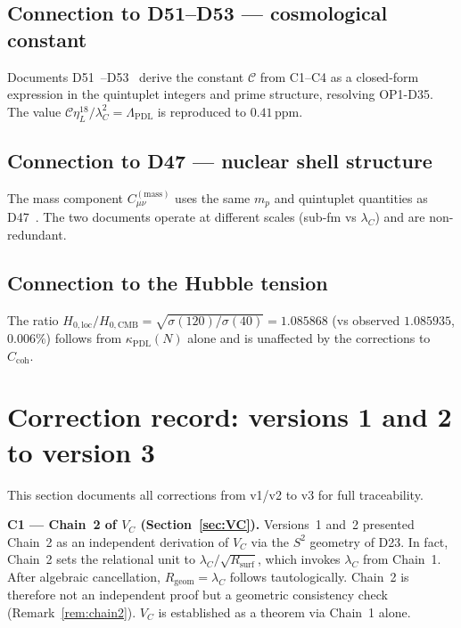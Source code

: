 \documentclass[12pt,a4paper]{article}
\newcommand{\Ccoh}{C_{\mathrm{coh}}}
\newcommand{\Cmass}{C^{(\mathrm{mass})}}
\newcommand{\sig}{\sigma}
\newcommand{\kPDL}{\kappa_{\mathrm{PDL}}}
\newcommand{\Rsurf}{R_{\mathrm{surf}}}
\newcommand{\lambdaC}{\lambda_C}
\newcommand{\VC}{V_C}
\newcommand{\etaL}{\eta_L}
\newcommand{\LambdaPDL}{\Lambda_{\mathrm{PDL}}}
\begin{document}
\subsection{Connection to D51--D53 --- cosmological constant}

Documents D51~\cite{PDL_D51_2026}--D53~\cite{PDL_D53_2026} derive the constant $\mathcal{C}$ from C1--C4 as a closed-form expression in the quintuplet integers and prime structure, resolving OP1-D35. The value $\mathcal{C}\etaL^{18}/\lambdaC^2 = \LambdaPDL$ is reproduced to $0.41$\,ppm.

\subsection{Connection to D47 --- nuclear shell structure}

The mass component $\Cmass_{\mu\nu}$ uses the same $m_p$ and quintuplet quantities as D47~\cite{PDL_D47_2026}. The two documents operate at different scales (sub-fm vs $\lambdaC$) and are non-redundant.

\subsection{Connection to the Hubble tension}

The ratio $H_{0,\mathrm{loc}}/H_{0,\mathrm{CMB}} = \sqrt{\sig(120)/\sig(40)} = 1.085868$ (vs observed $1.085935$, $0.006\%$) follows from $\kPDL(N)$ alone and is unaffected by the corrections to $\Ccoh$.

\section{Correction record: versions 1 and 2 to version 3}
\label{sec:corrections}

This section documents all corrections from v1/v2 to v3 for full traceability.

\textbf{C1 --- Chain~2 of $\VC$ (Section~\ref{sec:VC}).} Versions~1 and~2 presented Chain~2 as an independent derivation of $\VC$ via the $S^2$ geometry of D23. In fact, Chain~2 sets the relational unit to $\lambdaC/\sqrt{\Rsurf}$, which invokes $\lambdaC$ from Chain~1. After algebraic cancellation, $R_{\mathrm{geom}} = \lambdaC$ follows tautologically. Chain~2 is therefore not an independent proof but a geometric consistency check (Remark~\ref{rem:chain2}). $\VC$ is established as a theorem via Chain~1 alone.
\end{document}
